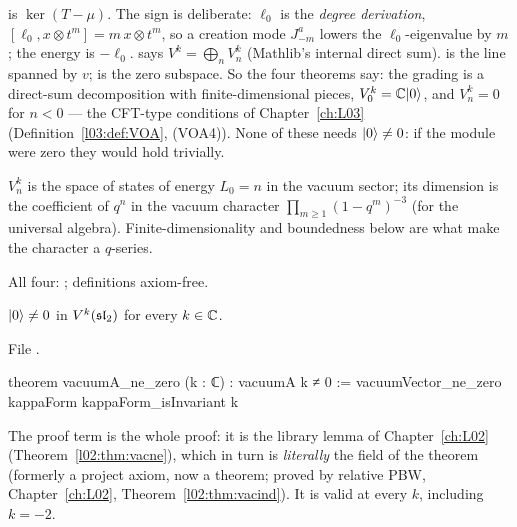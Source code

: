 \begin{dictionary}
\allowbreak{}\allowbreak{} is $\ker(T-\mu)$. The sign is deliberate: $\ell_0$ is the
\emph{degree derivation}, $[\ell_0,x\otimes t^m] = m\,x\otimes t^m$, so a creation mode $J^a_{-m}$
lowers the $\ell_0$-eigenvalue by $m$; the energy is $-\ell_0$.  says
$V^k = \bigoplus_n V^k_n$ (Mathlib's internal direct sum).  is the line spanned by $v$;
 is the zero subspace. So the four theorems say: the grading is a direct-sum decomposition
with finite-dimensional pieces, $V^k_0 = {\mathbb{C}}|0\rangle$, and $V^k_n = 0$ for $n<0$ --- the CFT-type
conditions of Chapter~\ref{ch:L03} (Definition~\ref{l03:def:VOA}, (VOA4)). None of these needs
$|0\rangle\ne0$: if the module were zero they would hold trivially.
\end{dictionary}

\begin{physics}
$V^k_n$ is the space of states of energy $L_0 = n$ in the vacuum sector; its dimension is the
coefficient of $q^n$ in the vacuum character $\prod_{m\ge1}(1-q^m)^{-3}$ (for the universal algebra).
Finite-dimensionality and boundedness below are what make the character a $q$-series.
\end{physics}

\begin{status}
All four: \lean{[propext, Classical.}\allowbreak{}\allowbreak\lean{sound]}; definitions axiom-free.
\end{status}

\begin{theorem}\label{l08:thm:vacpbw}
$|0\rangle\ne0$ in $V^k(\mathfrak{sl}_2)$ for every $k\in{\mathbb{C}}$.
\end{theorem}

\noindent File .
\begin{leancode}
theorem vacuumA_ne_zero (k : ℂ) : vacuumA k ≠ 0 :=
  vacuumVector_ne_zero kappaForm kappaForm_isInvariant k
\end{leancode}

\begin{dictionary}
The proof term is the whole proof: it is the library lemma \allowbreak{}\allowbreak{}\allowbreak{} of
Chapter~\ref{ch:L02} (Theorem~\ref{l02:thm:vacne}), which in turn is \emph{literally} the field
 of the theorem  (formerly a project axiom, now a theorem; proved by relative PBW,
Chapter~\ref{ch:L02}, Theorem~\ref{l02:thm:vacind}). It is valid at every $k$, including $k=-2$.
\end{dictionary}


